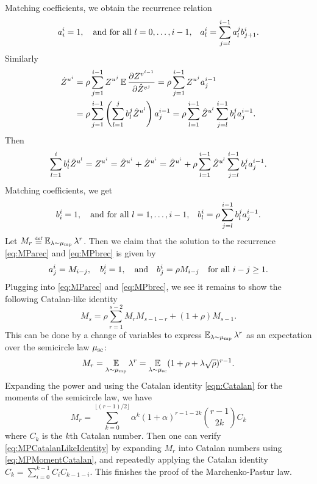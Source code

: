 \documentclass[main.tex]{subfiles}
\begin{document}
Matching coefficients, we obtain the recurrence relation
\begin{equation}
a_{i}^{i}=1,\quad\text{and for all \ensuremath{l=0,\ldots,i-1,}}\quad a_{l}^{i}=\sum_{j=l}^{i-1}a_{l}^{j}b_{j+1}^{i}.\label{eq:MParec}
\end{equation}
Similarly
\begin{align*}
\dot Z^{u^{i}} & =\rho\sum_{j=1}^{i-1}Z^{u^{j}}\operatorname*{\mathbb{E}}\frac{\partial Z^{v^{i-1}}}{\partial\hat{Z}^{v^{j}}}=\rho\sum_{j=1}^{i-1}Z^{u^{j}}a_{j}^{i-1}\\
 & =\rho\sum_{j=1}^{i-1}\left(\sum_{l=1}^{j}b_{l}^{j}\hat{Z}^{u^{l}}\right)a_{j}^{i-1}=\rho\sum_{l=1}^{i-1}\hat{Z}^{u^{l}}\sum_{j=l}^{i-1}b_{l}^{j}a_{j}^{i-1}.
\end{align*}
Then
\[
\sum_{l=1}^{i}b_{l}^{i}\hat{Z}^{u^{l}}=Z^{u^{i}}=\hat{Z}^{u^{i}}+\dot Z^{u^{i}}=\hat{Z}^{u^{i}}+\rho\sum_{l=1}^{i-1}\hat{Z}^{u^{l}}\sum_{j=l}^{i-1}b_{l}^{j}a_{j}^{i-1}.
\]
Matching coefficients, we get
\begin{equation}
b_{i}^{i}=1,\quad\text{and for all \ensuremath{l=1,\ldots,i-1},}\quad b_{l}^{i}=\rho\sum_{j=l}^{i-1}b_{l}^{j}a_{j}^{i-1}.\label{eq:MPbrec}
\end{equation}
Let $M_{r}\defeq\EV_{\lambda\sim\mump}\lambda^{r}$. Then we claim that the solution to the recurrence \cref{eq:MParec} and \cref{eq:MPbrec} is given by
\[
a_{j}^{i}=M_{i-j},\quad b_{i}^{i}=1,\quad\text{and}\quad b_{j}^{i}=\rho M_{i-j}\quad\text{for all \ensuremath{i-j\ge1}}.
\]
Plugging into \cref{eq:MParec} and \cref{eq:MPbrec}, we see it remains to show the following Catalan-like identity
\begin{equation}
M_{s}=\rho\sum_{r=1}^{s-2}M_{r}M_{s-1-r}+(1+\rho)M_{s-1}.\label{eq:MPCatalanLikeIdentity}
\end{equation}
This can be done by a change of variables to express $\operatorname*{\mathbb{E}}_{\lambda\sim\mu_{\mathrm{mp}}}\lambda^{r}$ as an expectation over the semicircle law $\mu_{\mathrm{sc}}$:
\[
M_{r}=\operatorname*{\mathbb{E}}_{\lambda\sim\mu_{\mathrm{mp}}}\lambda^{r}=\operatorname*{\mathbb{E}}_{\lambda\sim\mu_{\mathrm{sc}}}(1+\rho+\lambda\sqrt{\rho})^{r-1}.
\]
Expanding the power and using the Catalan identity \cref{eqn:Catalan} for the moments of the semicircle law, we have
\begin{equation}
M_{r}=\sum_{k=0}^{\lfloor(r-1)/2\rfloor}\alpha^{k}(1+\alpha)^{r-1-2k}\binom{r-1}{2k}C_{k}\label{eq:MPMomentCatalan}
\end{equation}
where $C_{k}$ is the $k$th Catalan number. Then one can verify \cref{eq:MPCatalanLikeIdentity} by expanding $M_{r}$ into Catalan numbers using \cref{eq:MPMomentCatalan}, and repeatedly applying the Catalan identity $C_{k}=\sum_{i=0}^{k-1}C_{i}C_{k-1-i}$. This finishes the proof of the Marchenko-Pastur law.
\end{document}
